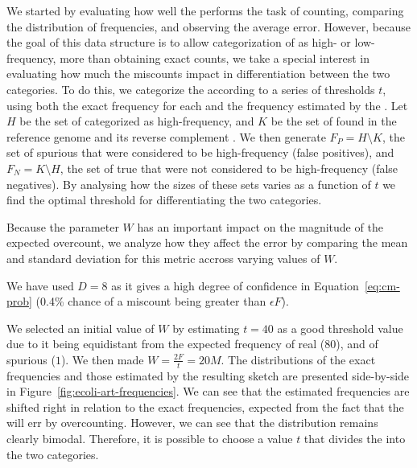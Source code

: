 We started by evaluating how well the \dBCM performs the task of \kmer counting, comparing the distribution of frequencies, and observing the average error. However, because the goal of this data structure is to allow categorization of  as high- or low-frequency, more than obtaining exact \kmer counts, we take a special interest in evaluating how much the miscounts impact in differentiation between the two categories. To do this, we categorize the  according to a series of thresholds $t$, using both the exact frequency for each \kmer and the frequency estimated by the \dBCM. Let $H$ be the set of  categorized as high-frequency, and $K$ be the set of  found in the reference genome  and its reverse complement . We then generate $F_P = H \setminus K$, the set of spurious  that were considered to be high-frequency (false positives), and $F_N = K \setminus H$, the set of true  that were not considered to be high-frequency (false negatives). By analysing how the sizes of these sets varies as a function of $t$ we find the optimal threshold for differentiating the two categories.

Because the parameter $W$ has an important impact on the magnitude of the expected overcount, we analyze how they affect the error by comparing the mean and standard deviation for this metric accross varying values of $W$.

We have used $D = 8$ as it gives a high degree of confidence in Equation~\ref{eq:cm-prob} (0.4\% chance of a miscount being greater than $\epsilon F$).

We selected an initial value of $W$ by estimating $t = 40$ as a good threshold value due to it being equidistant from the expected frequency of real  ($80$), and of spurious  ($1$). We then made $W = \frac{2F}{t} = 20M$. The distributions of the exact frequencies and those estimated by the resulting \dBCM sketch are presented side-by-side in Figure~\ref{fig:ecoli-art-frequencies}. We can see that the estimated frequencies are shifted right in relation to the exact frequencies, expected from the fact that the \dBCM will err by overcounting. However, we can see that the distribution remains clearly bimodal. Therefore, it is possible to choose a value $t$ that divides the  into the two categories.

